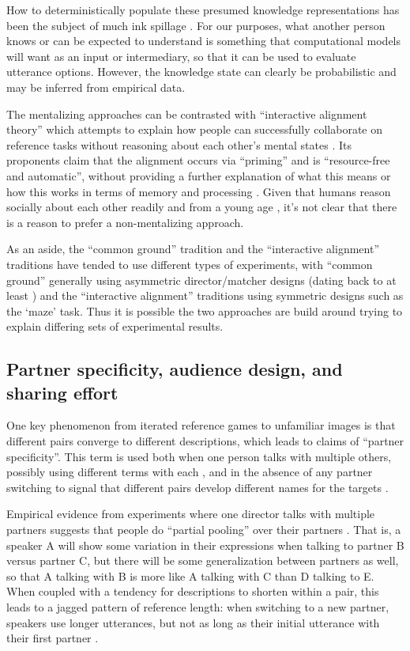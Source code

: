 \documentclass[]{article}
\begin{document}
How to deterministically populate these presumed knowledge representations has been the subject of much ink spillage \citep{horton1996,clark1996, brown-schmidt2012}. For our purposes, what another person knows or can be expected to understand is something that computational models will want as an input or intermediary, so that it can be used to evaluate utterance options. However, the knowledge state can clearly be probabilistic and may be inferred from empirical data. 

The mentalizing approaches can be contrasted with ``interactive alignment theory'' which attempts to explain how people can successfully collaborate on reference tasks without reasoning about each other's mental states \citep{pickering2004, gandolfi2022}. Its proponents claim that the alignment occurs via ``priming'' and is ``resource-free and automatic'', without providing a further explanation of what this means or how this works in terms of memory and processing \citep{pickering2004}.  Given that humans reason socially about each other readily and from a young age \citep{rakoczy2022}, it's not clear that there is a reason to prefer a non-mentalizing approach. 

As an aside, the ``common ground'' tradition and the ``interactive alignment'' traditions have tended to use different types of experiments, with ``common ground'' generally using asymmetric director/matcher designs (dating back to at least \citet{krauss1966}) and the ``interactive alignment'' traditions using symmetric designs such as the `maze' task. Thus it is possible the two approaches are build around trying to explain differing sets of experimental results. 

\subsection{Partner specificity, audience design, and sharing effort}

One key phenomenon from iterated reference games to unfamiliar images is that different pairs converge to different descriptions, which leads to claims of ``partner specificity''. This term is used both when one person talks with multiple others, possibly using different terms with each \citep{TODO}, and in the absence of any partner switching to signal that different pairs develop different names for the targets \citep{TODO}. 

Empirical evidence from experiments where one director talks with multiple partners suggests that people do ``partial pooling'' over their partners \citep{hawkins2021, yoon2014}. That is, a speaker A will show some variation in their expressions when talking to partner B versus partner C, but there will be some generalization between partners as well, so that A talking with B is more like A talking with C than D talking to E. When coupled with a tendency for descriptions to shorten within a pair, this leads to a jagged pattern of reference length: when switching to a new partner, speakers use longer utterances, but not as long as their initial utterance with their first partner \citep{yoon2019a}.  
\end{document}
